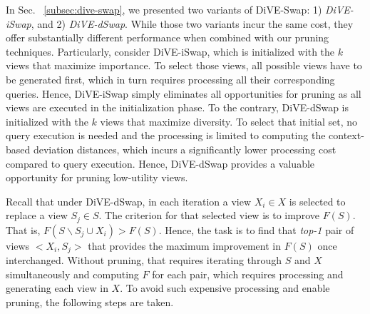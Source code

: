 In Sec. ~\ref{subsec:dive-swap}, we presented two variants of DiVE-Swap: 1) \textit{DiVE-iSwap}, and 2) \textit{DiVE-dSwap}.
%
While those two variants incur the same cost, they offer substantially different performance when combined with our pruning techniques. 
%
Particularly, consider DiVE-iSwap, which is initialized with the $k$ views that maximize importance. 
%
%
To select those views, all possible views have to be generated first, which in turn requires processing all their corresponding queries. 
%
Hence, DiVE-iSwap simply eliminates all opportunities for pruning as all views are executed in the initialization phase. 
%
To the contrary, DiVE-dSwap is initialized with the $k$ views that maximize diversity.
%
To select that initial set, no query execution is needed and the processing is limited to computing the context-based deviation distances, which incurs  a significantly lower processing cost compared to query execution. 
%
Hence, DiVE-dSwap provides a valuable opportunity for pruning low-utility views. 


Recall that under DiVE-dSwap, in each iteration a view $X_i \in X$ is selected to replace a view $S_j \in S$. 
%
The criterion for that selected view is to improve $F\left(S\right)$. 
%
That is, $F(S \backslash S_j \cup X_i) >  F(S)$. 
%
Hence, the task is to find that {\em top-1} pair of views $<X_i, S_j>$ that provides the maximum improvement in $F\left(S\right)$ once interchanged. 
%
Without pruning, that requires iterating through $S$ and $X$ simultaneously and computing $F$ for each pair, which requires processing and generating each view in $X$. 
%
To avoid such expensive processing and enable pruning, the following steps are taken. 
%


